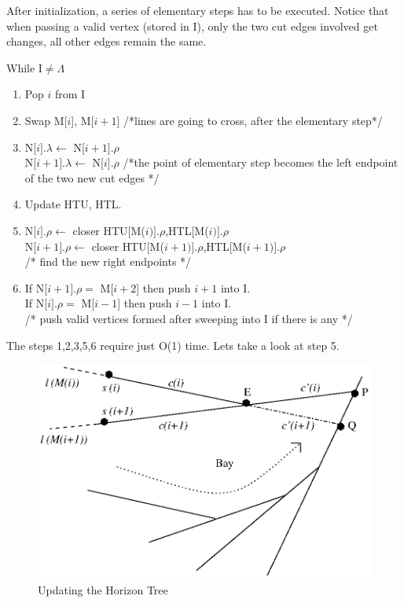 \documentclass[12pt]{article}
\begin{document}
        \vspace{.2 cm}

        After initialization, a series of elementary steps has to be executed.
        Notice that when passing a valid vertex (stored in I), only the two
        cut edges involved get changes, all other edges remain the same.

        \vspace{.2 cm}

        While I$\neq \Lambda$
        \begin{enumerate}
            \item Pop $i$ from I
            \item Swap M[$i$], M[$i+1$] /*lines are going to cross, after the elementary step*/
            \item N[$i].\lambda \leftarrow$ N[$i+1].\rho $ \\
                N[$i+1].\lambda \leftarrow$ N[$i].\rho $ /*the point of elementary step
            becomes the left endpoint of the two new cut edges */ 
            \item Update HTU, HTL.
            \item N[$i].\rho \leftarrow $ closer {HTU[M($i)].\rho$,HTL[M($i)].\rho$} \\
                N[$i+1].\rho \leftarrow$ closer {HTU[M($i+1)].\rho$,HTL[M($i+1)].\rho$} \\
                /* find the new right endpoints */
            \item If N[$i+1].\rho =$ M[$i+2$] then push $i+1$ into I. \\
                If N[$i].\rho =$ M[$i-1$] then push $i-1$ into I. \\
                /* push valid vertices formed after sweeping into I if there is any */
        \end{enumerate}

        The steps 1,2,3,5,6 require just O(1) time. Lets take a look at step 5.


        \begin{figure}
            \center
            \includegraphics[viewport=205 290 401 426]{update_htu.eps}
            \caption{Updating the Horizon Tree}
            \label{figure.update_htu}
        \end{figure}
\end{document}
